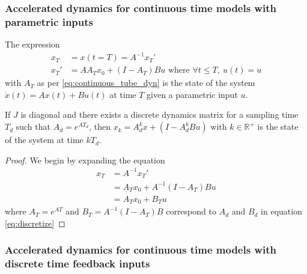 \documentclass[sigconf]{llncs}
\newcommand{\mat}[1]{{#1}}
\renewcommand{\vec}[1]{{#1}}
\begin{document}
 \subsubsection{Accelerated dynamics for continuous time models with parametric inputs}\label{sec:cont_acc_param_inputs}
\begin{theorem}
The expression
 \begin{align}
 \vec{x}_T&=\vec{x}(t=T)=\mat{A}^{-1}\vec{x}_T'\nonumber\\
\vec{x}_T'&=\mat{A}\mat{A}_T\vec{x}_0 + (\mat{I}-\mat{A}_T)\mat{B}\vec{u} \text{ where } \forall t \leq T,\ \vec{u}(t)=\vec{u} 
 \end{align}
 with $\mat{A}_T$ as per \eqref{eq:continuous_tube_dyn} is the state of the system $\dot{\vec{x}}(t)=\mat{A}\vec{x}(t)+\mat{B}\vec{u}(t)$ at time $T$ given a parametric input $\vec{u}$.
 \end{theorem}
 \begin{corollary}
 If $\mat{J}$ is diagonal and there exists a discrete dynamics matrix for a sampling time $T_d$ such that $A_d=e^{\mat{A} T_d}$, then $\vec{x}_k=A_d^k\vec{x}+(\mat{I}-\mat{A}_d^k\mat{B}\vec{u}) \text{ with } k \in \mathbb{R}^+$ is the state of the system at time $kT_d$.
 \end{corollary}
 \begin{proof}
 We begin by expanding the equation
 \begin{align}
 \vec{x}_T&=\mat{A}^{-1}\vec{x}_T'\nonumber\\
 &=\mat{A}_T\vec{x}_0 + \mat{A}^{-1}(\mat{I}-\mat{A}_T)\mat{B}\vec{u}\nonumber\\
 &= \mat{A}_T\vec{x}_0 + \mat{B}_T\vec{u}
 \end{align}
 where $\mat{A}_T=e^{\mat{A}T}$ and $\mat{B}_T=\mat{A}^{-1}(\mat{I}-\mat{A}_T)\mat{B}$ correspond to $\mat{A}_d$ and $\mat{B}_d$ in equation \eqref{eq:discretize}
 \end{proof}
  
 \subsubsection{Accelerated dynamics for continuous time models with discrete time feedback inputs}\label{asec:real_discrete_feedback_inputs}
\end{document}
